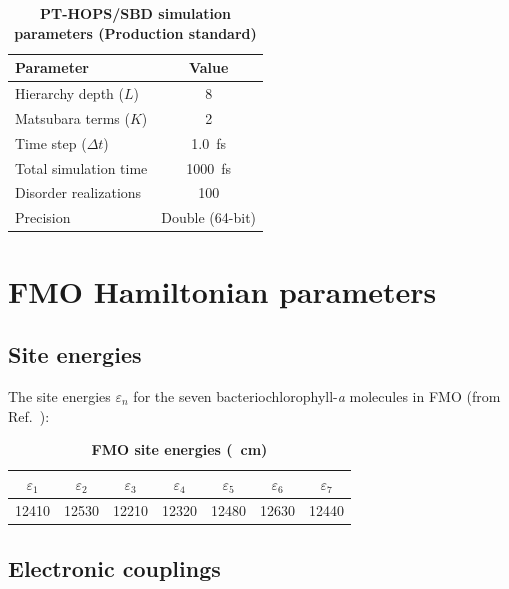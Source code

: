 \documentclass[11pt,a4paper]{article}
\begin{document}
\begin{table}[htb]
\centering
\caption{\textbf{PT-HOPS/SBD simulation parameters (Production standard)}}
\label{tab:SI_parameters}
\begin{tabular}{lc}
\toprule
\textbf{Parameter} & \textbf{Value} \\
\midrule
Hierarchy depth ($L$) & 8 \\
Matsubara terms ($K$) & 2 \\
Time step ($\Delta t$) & \SI{1.0}{\femto\second} \\
Total simulation time & \SI{1000}{\femto\second} \\
Disorder realizations & 100 \\
Precision & Double (64-bit) \\
\bottomrule
\end{tabular}
\end{table}



\section{FMO Hamiltonian parameters}
\label{sec:S2}

\subsection{Site energies}

The site energies $\varepsilon_n$ for the seven bacteriochlorophyll-\textit{a} molecules in FMO (from Ref.\ \cite{Adolphs2006}):

\begin{table}[htb]
\centering
\caption{\textbf{FMO site energies (\si{\per\centi\meter})}}
\label{tab:SI_site_energies}
\begin{tabular}{ccccccc}
\toprule
$\varepsilon_1$ & $\varepsilon_2$ & $\varepsilon_3$ & $\varepsilon_4$ & $\varepsilon_5$ & $\varepsilon_6$ & $\varepsilon_7$ \\
\midrule
12410 & 12530 & 12210 & 12320 & 12480 & 12630 & 12440 \\
\bottomrule
\end{tabular}
\end{table}

\subsection{Electronic couplings}
\end{document}
